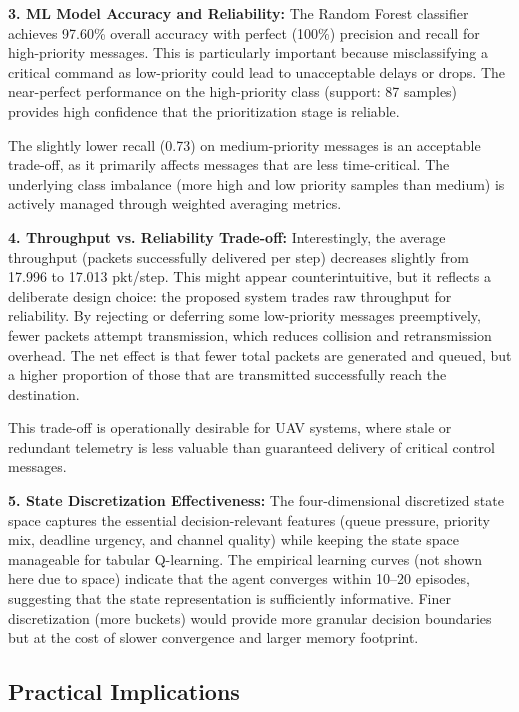 \documentclass[pdflatex,sn-mathphys-num]{sn-jnl}%
\theoremstyle{thmstyleone}%
\theoremstyle{thmstyletwo}%
\theoremstyle{thmstylethree}%
\begin{document}
\textbf{3. ML Model Accuracy and Reliability:} The Random Forest classifier achieves 97.60\% overall accuracy with perfect (100\%) precision and recall for high-priority messages. This is particularly important because misclassifying a critical command as low-priority could lead to unacceptable delays or drops. The near-perfect performance on the high-priority class (support: 87 samples) provides high confidence that the prioritization stage is reliable.

The slightly lower recall (0.73) on medium-priority messages is an acceptable trade-off, as it primarily affects messages that are less time-critical. The underlying class imbalance (more high and low priority samples than medium) is actively managed through weighted averaging metrics.

\textbf{4. Throughput vs. Reliability Trade-off:} Interestingly, the average throughput (packets successfully delivered per step) decreases slightly from 17.996 to 17.013 pkt/step. This might appear counterintuitive, but it reflects a deliberate design choice: the proposed system trades raw throughput for reliability. By rejecting or deferring some low-priority messages preemptively, fewer packets attempt transmission, which reduces collision and retransmission overhead. The net effect is that fewer total packets are generated and queued, but a higher proportion of those that are transmitted successfully reach the destination.

This trade-off is operationally desirable for UAV systems, where stale or redundant telemetry is less valuable than guaranteed delivery of critical control messages.

\textbf{5. State Discretization Effectiveness:} The four-dimensional discretized state space captures the essential decision-relevant features (queue pressure, priority mix, deadline urgency, and channel quality) while keeping the state space manageable for tabular Q-learning. The empirical learning curves (not shown here due to space) indicate that the agent converges within 10–20 episodes, suggesting that the state representation is sufficiently informative. Finer discretization (more buckets) would provide more granular decision boundaries but at the cost of slower convergence and larger memory footprint.

\subsection{ Practical Implications }
\end{document}
